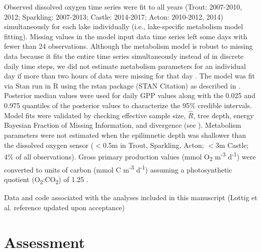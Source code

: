 \documentclass[12pt, oneside]{article}
\begin{document}
Observed dissolved oxygen time series were fit to all years (Trout: 2007-2010, 2012; Sparkling: 2007-2013; Castle: 2014-2017; Acton: 2010-2012, 2014) simultaneously for each lake individually (i.e., lake-specific metabolism model fitting). Missing values in the model input data time series left some days with fewer than 24 observations. Although the metabolism model is robust to missing data because it fits the entire time series simultaneously instead of in discrete daily time steps, we did not estimate metabolism parameters for an individual day if more than two hours of data were missing for that day \citep{phillips_timevarying_2020}. The model was fit via Stan \citep{stan} run in R \citep{rcore} using the rstan package (STAN Citation) as described in \citep{phillips_timevarying_2020}. Posterior median values were used for daily GPP values along with the 0.025 and 0.975 quantiles of the posterior values to characterize the 95\% credible intervals. Model fits were validated by checking effective sample size, $\hat{R}$, tree depth, energy Bayesian Fraction of Missing Information, and divergence (see \citealt{betancourt_robust_2007}). Metabolism parameters were not estimated when the epilimnetic depth was shallower than the dissolved oxygen sensor ($<$0.5m in Trout, Sparkling, Acton; $<$3m Castle; 4\% of all observations). Gross primary production values (mmol O\textsubscript{2} m\textsuperscript{-3} d\textsuperscript{-1}) were converted to units of carbon (mmol C m\textsuperscript{-3} d\textsuperscript{-1}) assuming a photosynthetic quotient (O\textsubscript{2}:CO\textsubscript{2}) of 1.25 \citep{bott_primary_1996,hanson_lake_2003,wielgat-rychert_calculation_2017}. 

Data and code associated with the analyses included in this manuscript (Lottig et al. reference updated upon acceptance)

\section*{Assessment}
\end{document}
